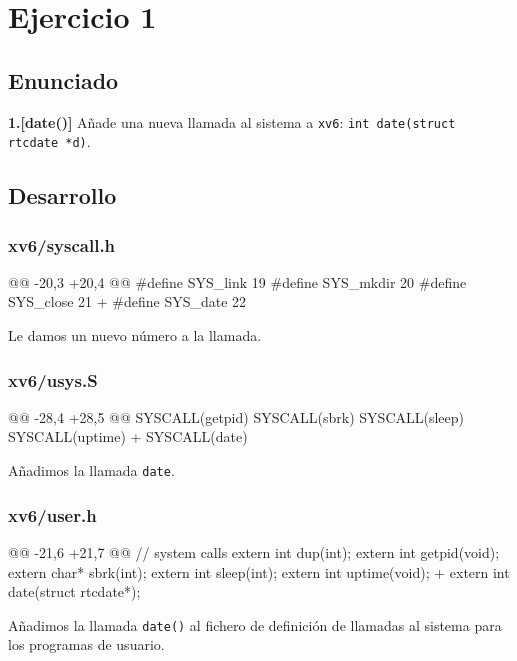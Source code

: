 \section{Ejercicio 1}
\subsection{Enunciado}
\begin{ejer}
    \textbf{1.[date()]} Añade una nueva llamada al sistema a \texttt{xv6}: \texttt{int date(struct rtcdate *d)}.
\end{ejer}
\subsection{Desarrollo}

\subsubsection{xv6/syscall.h}
\begin{listing}
@@ -20,3 +20,4 @@
    #define SYS_link   19
    #define SYS_mkdir  20
    #define SYS_close  21
+   #define SYS_date   22
\end{listing}
\par Le damos un nuevo número a la llamada.

\subsubsection{xv6/usys.S}
\begin{listing}
@@ -28,4 +28,5 @@
    SYSCALL(getpid)
    SYSCALL(sbrk)
    SYSCALL(sleep)
    SYSCALL(uptime)
+   SYSCALL(date)
\end{listing}
\par Añadimos la llamada \texttt{date}.

\subsubsection{xv6/user.h}
\begin{listing}
@@ -21,6 +21,7 @@ 
// system calls
    extern int dup(int);
    extern int getpid(void);
    extern char* sbrk(int);
    extern int sleep(int);
    extern int uptime(void);
+   extern int date(struct rtcdate*);
\end{listing}
\par Añadimos la llamada \texttt{date()} al fichero de definición de llamadas 
al sistema para los programas de usuario.

